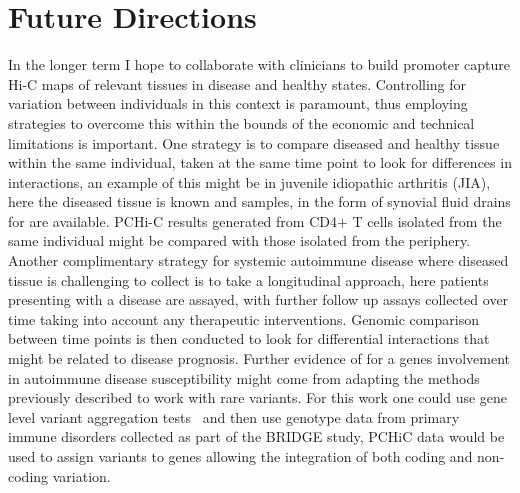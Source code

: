 \documentclass[a4paper,11pt]{report}
\begin{document}
\section{Future Directions}
In the longer term I hope to collaborate with clinicians to build promoter capture Hi-C maps of relevant tissues in disease and healthy states. Controlling for variation between individuals in this context is paramount, thus employing strategies to overcome this within the bounds of the economic and technical limitations is important. One strategy is to compare diseased and healthy tissue within the same individual, taken at the same time point to  look for differences in interactions, an example of this might be in juvenile idiopathic arthritis (JIA), here the diseased tissue is known and samples, in the form of synovial fluid drains for are available. PCHi-C results generated from CD4$+$ T cells isolated from the same individual might be compared with those isolated from the periphery. Another complimentary strategy for systemic autoimmune disease where diseased tissue is challenging to collect is to take a longitudinal approach, here patients presenting with a disease are assayed, with further follow up assays collected over time taking into account any therapeutic interventions. Genomic comparison between time points is then conducted to look for differential interactions that might be related to disease prognosis. Further evidence of for a genes involvement in autoimmune disease susceptibility might come from adapting the methods previously described to work with rare variants. For this work one could use gene level variant aggregation tests~\citep{LeeTeslovichBoehnkeEtAl2013} and then use genotype data from primary immune disorders collected as part of the BRIDGE study, PCHiC data would be used to assign variants to genes allowing the integration of both coding and non-coding variation.

\appendix

	
	\begin{landscape}
	 	
	\end{landscape}
	

%

\end{document}
